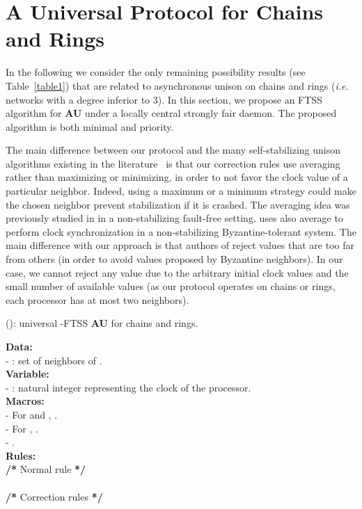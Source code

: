 \documentclass[11pt,english,letterpaper]{article}
\begin{document}
\section{A Universal Protocol for Chains and Rings}\label{sec:positive} 

In the following we consider the only remaining possibility results (see Table~\ref{table1}) that are related to asynchronous unison on chains and rings (\emph{i.e.} networks with a degree inferior to 3). In this section, we propose an FTSS algorithm for \textbf{AU} under a locally central strongly fair daemon. The proposed algorithm is both minimal and priority.

The main difference between our protocol and the many self-stabilizing unison algorithms existing in the literature~\cite{DH07cb,D97j,DW97j,PT97j} is that our correction rules use averaging rather than maximizing or minimizing, in order to not favor the clock value of a particular neighbor. Indeed, using a maximum or a minimum strategy could make the chosen neighbor prevent stabilization if it is crashed. The averaging idea was previously studied in \cite{LR04c} in a non-stabilizing fault-free setting. \cite{LM85j} uses also average to perform clock synchronization in a non-stabilizing Byzantine-tolerant system. The main difference with our approach is that authors of \cite{LM85j} reject values that are too far from others (in order to avoid values proposed by Byzantine neighbors). In our case, we cannot reject any value due to the arbitrary initial clock values and the small number of available values (as our protocol operates on chains or rings, each processor has at most two neighbors).

\begin{algorithm}
\caption{(): universal -FTSS \textbf{AU} for chains and rings.}\label{algo:uftss}
\begin{small}		
\textbf{Data:}\\
- : set of neighbors of .\\
\textbf{Variable:}\\
- : natural integer representing the clock of the processor.\\
\textbf{Macros:}\\
- For  and , .\\
- For , .\\
- .\\
\textbf{Rules:}\\
\textbf{/{*}} Normal rule \textbf{{*}/}\\
\\
\textbf{/{*}} Correction rules \textbf{{*}/}\\
\\

\end{small}		
\end{algorithm}
\end{document}
